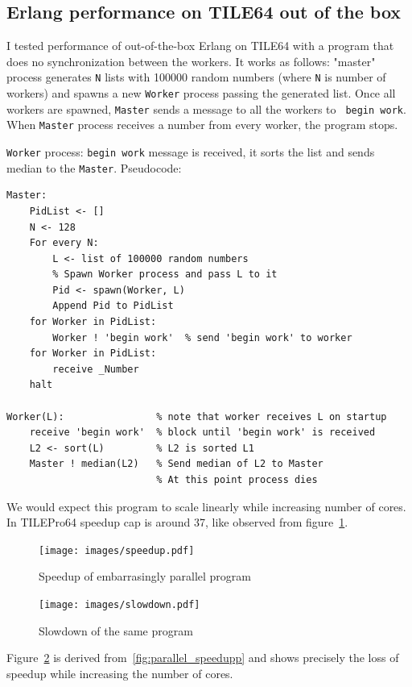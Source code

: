 \documentclass[english,11pt]{l4proj}
\begin{document}
\subsection{Erlang performance on TILE64 out of the box}

I tested performance of out-of-the-box Erlang on TILE64 with a program that does
no synchronization between the workers. It works as follows: "master" process
generates {\tt N} lists with 100000 random numbers (where {\tt N} is number of
workers) and spawns a new {\tt Worker} process passing the generated list. Once
all workers are spawned, {\tt Master} sends a message to all the workers to {\tt
begin work}. When {\tt Master} process receives a number from every worker, the
program stops.

{\tt Worker} process: {\tt begin work} message is received, it sorts the list
and sends median to the {\tt Master}. Pseudocode:

\begin{verbatim}
Master:
    PidList <- []
    N <- 128
    For every N:
        L <- list of 100000 random numbers
        % Spawn Worker process and pass L to it
        Pid <- spawn(Worker, L)
        Append Pid to PidList
    for Worker in PidList:
        Worker ! 'begin work'  % send 'begin work' to worker
    for Worker in PidList:
        receive _Number
    halt

Worker(L):                % note that worker receives L on startup
    receive 'begin work'  % block until 'begin work' is received
    L2 <- sort(L)         % L2 is sorted L1
    Master ! median(L2)   % Send median of L2 to Master
                          % At this point process dies
\end{verbatim}

We would expect this program to scale linearly while increasing number of cores.
In TILEPro64 speedup cap is around 37, like observed from
figure~\ref{fig:parallel_speedup}.

\begin{figure}
    \centering
    \texttt{[image: images/speedup.pdf]}
    \caption{Speedup of embarrasingly parallel program}
    \label{fig:parallel_speedup}
\end{figure}

\begin{figure}
    \centering
    \texttt{[image: images/slowdown.pdf]}
    \caption{Slowdown of the same program}
    \label{fig:parallel_slowdown}
\end{figure}

Figure~\ref{fig:parallel_slowdown} is derived from~\ref{fig:parallel_speedupp}
and shows precisely the loss of speedup while increasing the number of cores.
\end{document}
